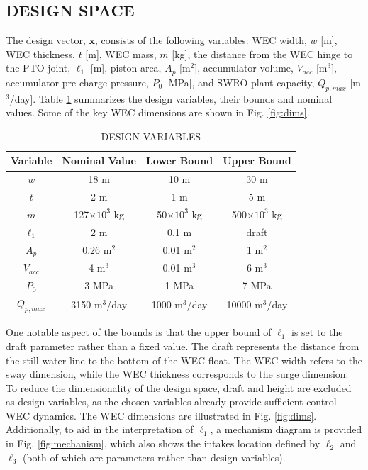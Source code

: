 \documentclass[twocolumn,10pt]{asme2e}
\begin{document}
\subsection{DESIGN SPACE}
The design vector, $\mathbf{x}$, consists of the following variables: WEC width, $w$ [m], WEC thickness, $t$ [m], WEC mass, $m$ [kg], the distance from the WEC hinge to the PTO joint, $\ell_1$ [m], piston area, $A_p$ [m$^2$], accumulator volume, $V_{acc}$ [m$^3$], accumulator pre-charge pressure, $P_0$ [MPa], and SWRO plant capacity, $Q_{p,max}$ [m$^3$/day]. Table \ref{tab:design_space} summarizes the design variables, their bounds and nominal values. Some of the key WEC dimensions are shown in Fig. \ref{fig:dims}.
\begin{table}[h]
    \centering
    \caption{DESIGN VARIABLES}
    \begin{tabular}{cccc}
        \hline
        Variable & Nominal Value & Lower Bound & Upper Bound\\
        \hline
        $w$ & 18 m & 10 m & 30 m \\
        $t$ & 2 m & 1 m & 5 m \\
        $m$ & 127$\times10^3$ kg & 50$\times10^3$ kg & 500$\times10^3$ kg \\
        $\ell_1$ & 2 m & 0.1 m & draft \\
        $A_p$ & 0.26 m$^2$ & 0.01 m$^2$ & 1 m$^2$ \\
        $V_{acc}$ & 4 m$^3$ & 0.01 m$^3$ & 6 m$^3$ \\
        $P_0$ & 3 MPa & 1 MPa & 7 MPa \\
        $Q_{p,max}$ & 3150 m$^3$/day & 1000 m$^3$/day & 10000 m$^3$/day\\
        \hline
    \end{tabular}
    \label{tab:design_space} 
\end{table}

One notable aspect of the bounds is that the upper bound of $\ell_1$ is set to the draft parameter rather than a fixed value. The draft represents the distance from the still water line to the bottom of the WEC float. The WEC width refers to the sway dimension, while the WEC thickness corresponds to the surge dimension. To reduce the dimensionality of the design space, draft and height are excluded as design variables, as the chosen variables already provide sufficient control WEC dynamics. The WEC dimensions are illustrated in Fig. \ref{fig:dims}. Additionally, to aid in the interpretation of $\ell_1$, a mechanism diagram is provided in Fig. \ref{fig:mechanism}, which also shows the intakes location defined by $\ell_2$ and $\ell_3$ (both of which are parameters rather than design variables).
\end{document}
